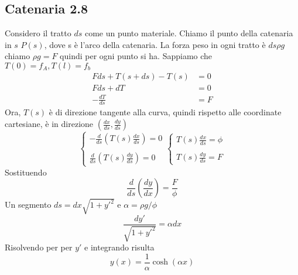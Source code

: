 \documentclass{article}
\begin{document}
\subsection{Catenaria 2.8}
Considero il tratto $ds$ come un punto materiale. Chiamo il punto della catenaria in $s$ $P(s)$, dove s è l'arco della catenaria.
La forza peso in ogni tratto è $ds \rho g$ chiamo $\rho g = F$ quindi per ogni punto si ha.
Sappiamo che $T(0) = f_A , T(l) = f_b$
\begin{equation}
    \begin{aligned}
        Fds + T(s+ds) - T(s) &= 0 \\
        Fds + dT &= 0 \\
        -\frac{dT}{ds} &= F
    \end{aligned}
\end{equation}
Ora, $T(s)$ è di direzione tangente alla curva, quindi rispetto alle coordinate cartesiane, è in direzione $(\frac{dx}{ds}, \frac{dy}{ds})$
\begin{equation}
    \begin{cases}
        \displaystyle -\frac{d}{ds}\left(T(s)\frac{dx}{ds}\right) = 0 \\ \\
        \displaystyle \frac{d}{ds}\left(T(s)\frac{dy}{ds}\right) = 0
    \end{cases}
    \begin{cases}
        \displaystyle T(s)\frac{dx}{ds} = \phi \\ \\
        \displaystyle T(s)\frac{dy}{ds} = F
    \end{cases}
\end{equation}
Sostituendo
\begin{equation}
    \displaystyle \frac{d}{ds} \left(\frac{dy}{dx}\right) = \frac{F}{\phi}
\end{equation}
Un segmento $ds = dx \sqrt{1 + y'^2}$ e $\alpha = \rho g / \phi$
\begin{equation}
    \displaystyle \frac{dy'}{\sqrt{1 + y'^2}} = \alpha dx
\end{equation}
Risolvendo per per $y'$ e integrando risulta
\begin{equation}
    y(x) = \frac{1}{\alpha} \cosh(\alpha x)
\end{equation}
\end{document}

